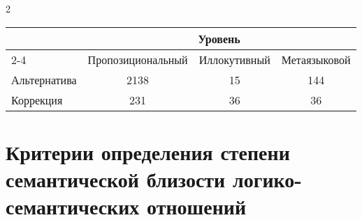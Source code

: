 \begin{multicols}{2}

\begin{table*}[b]\small %
\vspace*{-12pt}
\begin{center}
\vspace*{2ex}

\tabcolsep=10pt
\begin{tabular}{|l|c|c|c|}  
\hline
&\multicolumn{3}{c|}{Уровень}\\
\cline{2-4}
\multicolumn{1}{|c|}{\raisebox{6pt}[0pt][0pt]{ЛСО}}&Пропозициональный&Иллокутивный&Метаязыковой\\
\hline
Альтернатива&2138&15&144\\
Коррекция&\hphantom{9}231&36&\hphantom{9}36\\
\hline
\end{tabular}
\end{center}
\vspace*{-6pt}
\end{table*}

\section{Критерии определения степени семантической близости 
логико-семантических отношений }


\end{multicols}
